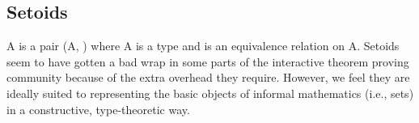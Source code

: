 \begin{code}%
\>[0]\<%
\\
\>[0]\AgdaSpace{}%
\AgdaModule{\AgdaUnderscore{}}\AgdaSpace{}%
\AgdaSymbol{\{}\AgdaSpace{}%
\AgdaSymbol{:}\AgdaSpace{}%
\AgdaSpace{}%
\AgdaSpace{}%
\AgdaSymbol{\}\{}\AgdaSpace{}%
\AgdaSymbol{:}\AgdaSpace{}%
\AgdaSpace{}%
\AgdaSpace{}%
\AgdaSpace{}%
\AgdaSymbol{\}}\AgdaSpace{}%
\<%
\\
\>[0][@{}l@{\AgdaIndent{0}}]%
\>[1]\AgdaSpace{}%
\AgdaSymbol{:}\AgdaSpace{}%
\AgdaFunction{Σ[}\AgdaSpace{}%
\AgdaSpace{}%
\AgdaSpace{}%
\AgdaSpace{}%
\AgdaFunction{]}\AgdaSpace{}%
\AgdaSpace{}%
\AgdaSpace{}%
\AgdaSpace{}%
\<%
\\
%
\>[1]\AgdaSpace{}%
\AgdaSymbol{=}\AgdaSpace{}%
\<%
\\
%
\>[1]\AgdaSpace{}%
\AgdaSymbol{:}\AgdaSpace{}%
\AgdaSymbol{(}\AgdaSpace{}%
\AgdaSymbol{:}\AgdaSpace{}%
\AgdaFunction{Σ[}\AgdaSpace{}%
\AgdaSpace{}%
\AgdaSpace{}%
\AgdaSpace{}%
\AgdaFunction{]}\AgdaSpace{}%
\AgdaSpace{}%
\AgdaSymbol{)}\AgdaSpace{}%
\AgdaSpace{}%
\AgdaSpace{}%
\AgdaSpace{}%
\AgdaSpace{}%
\<%
\\
%
\>[1]\AgdaSpace{}%
\AgdaSymbol{=}\AgdaSpace{}%
\<%
\end{code}
\fi

\subsection{Setoids}\label{setoids}
A  is a pair (\ab A, ) where \ab A is a type and 
is an equivalence relation on \ab A. Setoids seem to have gotten a bad wrap
in some parts of the interactive theorem proving community because of the extra
overhead they require. However, we feel they are ideally suited to
representing the basic objects of informal mathematics (i.e., sets)
in a constructive, type-theoretic way.

